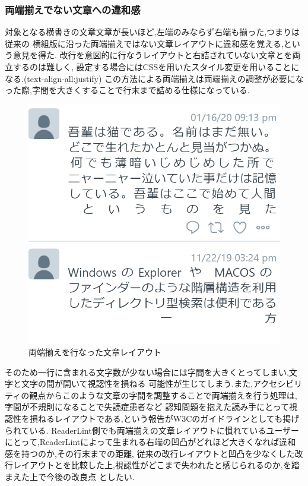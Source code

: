 \subsubsection{両端揃えでない文章への違和感}
対象となる横書きの文章文章が長いほど,左端のみならず右端も揃った,つまりは従来の
横組版に沿った両端揃えではない文章レイアウトに違和感を覚える,という意見を得た.
改行を意図的に行なうレイアウトと右詰されていない文章とを両立するのは難しく,
設定する場合にはCSSを用いたスタイル変更を用いることになる.(text-align-all:justify)
この方法による両端揃えは両端揃えの調整が必要になった際,字間を大きくすることで行末まで詰める仕様になっている.
\begin{figure}[H]
    \centering
    \label{fig:ryohashi}
    \includegraphics[width=0.5\columnwidth]{image/04/img1.png}
    \caption[両端揃えを行なった文章レイアウト] {両端揃えを行なった文章レイアウト}
\end{figure}

そのため一行に含まれる文字数が少ない場合には字間を大きくとってしまい,文字と文字の間が開いて視認性を損ねる
可能性が生じてしまう.また,アクセシビリティの観点からこのような文章の字間を調整することで両端揃えを行う処理は,字間が不規則になることで失読症患者など
認知問題を抱えた読み手にとって視認性を損ねるレイアウトである,という報告がW3Cのガイドラインとしても掲げられている.\cite{WCAG2.0} 
ReaderLint側でも両端揃えの文章レイアウトに慣れているユーザーにとって,ReaderLintによって生まれる右端の凹凸がどれほど大きくなれば違和感を持つのか,その行末までの距離,
従来の改行レイアウトと凹凸を少なくした改行レイアウトとを比較した上,視認性がどこまで失われたと感じられるのか,を踏まえた上で今後の改良点
としたい.

